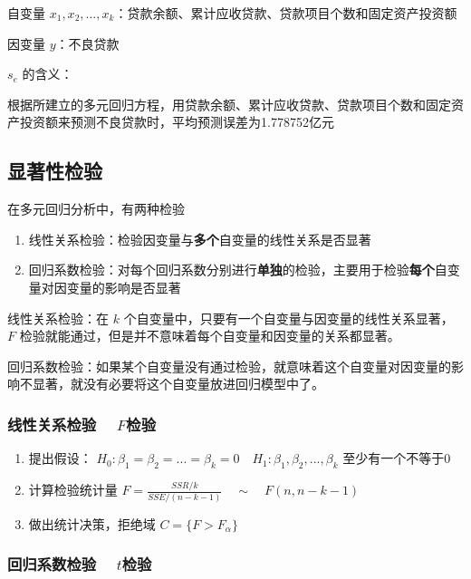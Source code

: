 \documentclass[UTF8,10pt]{book}
\begin{document}
{{自变量
\(x_1,x_2,...,x_k\)：贷款余额、累计应收贷款、贷款项目个数和固定资产投资额

因变量 \(y\)：不良贷款

\(s_e\) 的含义：

根据所建立的多元回归方程，用贷款余额、累计应收贷款、贷款项目个数和固定资产投资额来预测不良贷款时，平均预测误差为1.778752亿元
}

\subsection{显著性检验}\label{header-n228}

在多元回归分析中，有两种检验

\begin{enumerate}
	\def\labelenumi{\arabic{enumi}.}
	\item
	线性关系检验：检验因变量与\textbf{多个}自变量的线性关系是否显著
	\item
	回归系数检验：对每个回归系数分别进行\textbf{单独}的检验，主要用于检验\textbf{每个}自变量对因变量的影响是否显著
\end{enumerate}

{\kaishu
线性关系检验：在 \(k\)
个自变量中，只要有一个自变量与因变量的线性关系显著， \(F\)
检验就能通过，但是并不意味着每个自变量和因变量的关系都显著。

回归系数检验：如果某个自变量没有通过检验，就意味着这个自变量对因变量的影响不显著，就没有必要将这个自变量放进回归模型中了。
}

\subsubsection{线性关系检验 $\quad F$检验}\label{header-n238}

\begin{enumerate}
	\def\labelenumi{\arabic{enumi}.}
	\item
	提出假设：
	\(H_0 : \beta_1 = \beta_2 = ... = \beta_k = 0  \quad H_1 : \beta_1 , \beta_2 , ... , \beta_k\)
	至少有一个不等于0
	\item
	计算检验统计量
	\(F = \frac{SSR/k}{SSE/(n-k-1)} \quad \sim \quad F(n,n-k-1)\) 
	\item
	做出统计决策，拒绝域 \( C = \{ F>F_{\alpha} \} \)
\end{enumerate}

\subsubsection{回归系数检验 $\quad t$检验}\label{header-n246}

}
\end{document}
